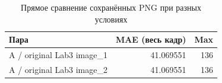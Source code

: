 \begin{table}[H]\centering\small
\caption{Прямое сравнение сохранённых PNG при разных условиях}
\begin{tabular}{@{}lrr@{}}\toprule Пара & MAE (весь кадр) & Max\\\midrule
A / original Lab3 image\_1 & 41.069551 & 136 \\
A / original Lab3 image\_2 & 41.069551 & 136 \\
\bottomrule\end{tabular}\end{table}